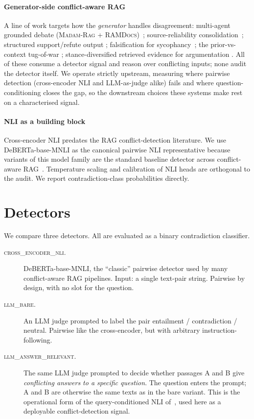 \documentclass[sigconf, nonacm, natbib]{acmart}
\begin{document}
\paragraph{Generator-side conflict-aware RAG}
A line of work targets how the \emph{generator} handles disagreement: multi-agent
grounded debate (\textsc{Madam-Rag} + \textsc{RAMDocs})~\citep{madamrag2025};
source-reliability consolidation~\citep{astuterag2024}; structured support/refute output
\citep{conrag2025}; falsification for sycophancy~\citep{fvarag2025}; the
prior-vs-context tug-of-war \citep{clasheval2024}; stance-diversified retrieved evidence
for argumentation \citep{conqret2025}. All of these consume a detector signal and
reason over conflicting inputs; none audit the detector itself. We operate strictly
upstream, measuring where pairwise detection (cross-encoder NLI and LLM-as-judge alike)
fails and where question-conditioning closes the gap, so the downstream choices these
systems make rest on a characterised signal.

\paragraph{NLI as a building block}
Cross-encoder NLI predates the RAG conflict-detection literature. We use
DeBERTa-base-MNLI as the canonical pairwise NLI representative because variants of this
model family are the standard baseline detector across conflict-aware
RAG~\citep{conflictrag2025,madamrag2025,contradetect2025}. Temperature scaling and
calibration of NLI heads \citep{guo2017calibration} are orthogonal to the audit. We
report contradiction-class probabilities directly.

\section{Detectors}
\label{sec:detectors}
We compare three detectors. All are evaluated as a binary contradiction classifier.
\begin{description}
  \item[\textsc{cross\_encoder\_nli}.] DeBERTa-base-MNLI, the ``classic'' pairwise
  detector used by many conflict-aware RAG pipelines. Input: a single text-pair string.
  Pairwise by design, with no slot for the question.
  \item[\textsc{llm\_bare}.] An LLM judge prompted to label the pair entailment /
  contradiction / neutral. Pairwise like the cross-encoder, but with arbitrary
  instruction-following.
  \item[\textsc{llm\_answer\_relevant}.] The same LLM judge prompted to decide whether
  passages A and B give \emph{conflicting answers to a specific question}. The question
  enters the prompt; A and B are otherwise the same texts as in the bare variant. This
  is the operational form of the query-conditioned NLI of~\citet{canby2025qnli}, used
  here as a deployable conflict-detection signal.
\end{description}
\end{document}
